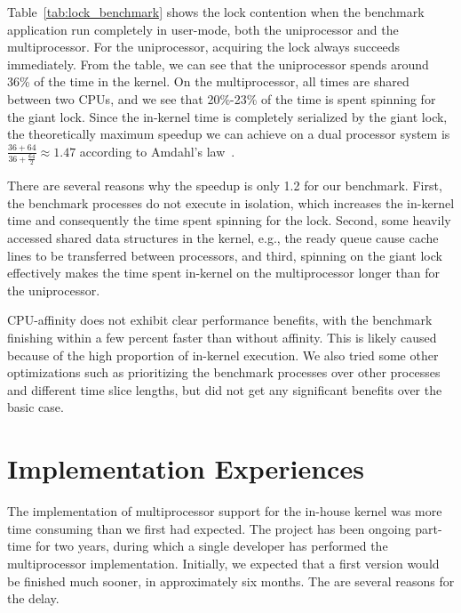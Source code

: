 Table~\ref{tab:lock_benchmark} shows the lock contention when the benchmark
application run completely in user-mode, both the uniprocessor and the
multiprocessor. For the uniprocessor, acquiring the lock always succeeds
immediately. From the table, we can see that the uniprocessor spends around
36\% of the time in the kernel. On the multiprocessor, all times are shared
between two CPUs, and we see that 20\%-23\% of the time is spent spinning for
the giant lock. Since the in-kernel time is completely serialized by the giant
lock, the theoretically maximum speedup we can achieve on a dual processor
system is $\frac{36+64}{36+\frac{64}{2}} \approx 1.47$ according to Amdahl's
law~\cite{amdahl67validity}.

There are several reasons why the speedup is only 1.2 for our benchmark.
First, the benchmark processes do not execute in isolation, which increases
the in-kernel time and consequently the time spent spinning for the lock.
Second, some heavily accessed shared data structures in the kernel, e.g., the
ready queue cause cache lines to be transferred between processors, and third,
spinning on the giant lock effectively makes the time spent in-kernel on the
multiprocessor longer than for the uniprocessor.

CPU-affinity does not exhibit clear performance benefits, with the benchmark
finishing within a few percent faster than without affinity. This is likely
caused because of the high proportion of in-kernel execution. We also tried
some other optimizations such as prioritizing the benchmark processes over
other processes and different time slice lengths, but did not get any
significant benefits over the basic case.

\section{Implementation Experiences}
\label{sec:implementation_experiences}

The implementation of multiprocessor support for the in-house kernel was more
time consuming than we first had expected. The project has been ongoing
part-time for two years, during which a single developer has performed the
multiprocessor implementation. Initially, we expected that a first version
would be finished much sooner, in approximately six months. The are several
reasons for the delay.

